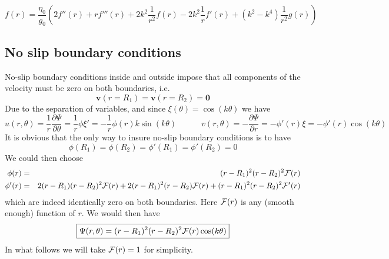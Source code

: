 \[
f(r) = \frac{\eta_0}{g_0} \left( 
2 f''(r)  + r f'''(r)  + 2k^2 \frac{1}{r^2} f(r)
-2k^2 \frac{1}{r} f'(r)  
+ (k^2-k^4) \frac{1}{r^2} g(r) 
\right)
\]






\subsection*{No slip boundary conditions}

No-slip boundary conditions inside and outside impose that all components of the velocity
must be zero on both boundaries, i.e.
\[
{\bm v}(r=R_1)={\bm v}(r=R_2)={\bm 0}
\]
Due to the separation of variables, and since  $\xi(\theta)=\cos(k\theta)$ we have
\[
u(r,\theta) = \frac{1}{r}\frac{\partial \Psi}{\partial \theta} 
=\frac{1}{r} \phi \xi' 
=-\frac{1}{r} \phi(r) k \sin(k \theta) 
\quad\quad\quad
v(r,\theta) = - \frac{\partial \Psi}{\partial r} 
= - \phi'(r) \xi 
= - \phi'(r) \cos(k\theta)
\]
It is obvious that the only way to insure no-slip boundary conditions is to have 
\[
\phi(R_1)=\phi(R_2)=\phi'(R_1)=\phi'(R_2)=0
\]
We could then choose
\begin{eqnarray}
\phi(r)&=&(r-R_1)^2(r-R_2)^2 {\cal F}(r) \\
\phi'(r)&=&2(r-R_1)(r-R_2)^2 {\cal F}(r)  +2(r-R_1)^2(r-R_2) {\cal F}(r) +(r-R_1)^2(r-R_2)^2 {\cal F}'(r)
\end{eqnarray}
which are indeed identically zero on both boundaries. Here ${\cal F}(r)$ is any (smooth enough) function of $r$.
We would then have
\[
\boxed{
\Psi(r,\theta) = (r-R_1)^2(r-R_2)^2 {\cal F}(r) \cos(k\theta)
}
\]
In what follows we will take ${\cal F}(r)=1$ for simplicity.

